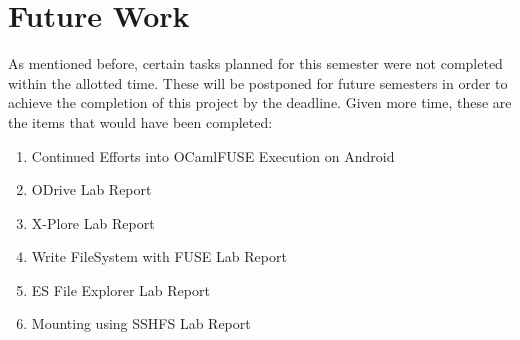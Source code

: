 \section{Future Work}
As mentioned before, certain tasks planned for this semester were not completed within the allotted time. These will be postponed for future semesters in order to achieve the completion of this project by the deadline. Given more time, these are the items that would have been completed:
\begin{enumerate}
\item Continued Efforts into OCamlFUSE Execution on Android
\item ODrive Lab Report
\item X-Plore Lab Report
\item Write FileSystem with FUSE Lab Report
\item ES File Explorer Lab Report
\item Mounting using SSHFS Lab Report
\end{enumerate}